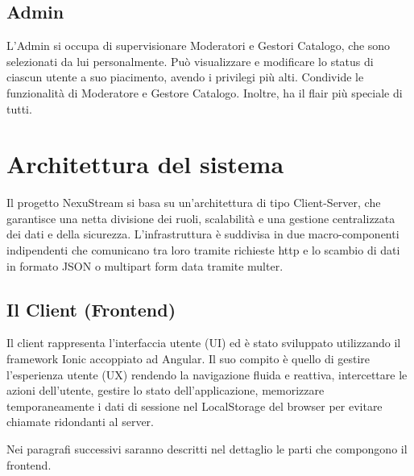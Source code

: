\documentclass[11pt,a4paper]{article}
\begin{document}
\subsection{Admin}
L'Admin si occupa di supervisionare Moderatori e Gestori Catalogo, che sono selezionati da lui personalmente. Può visualizzare e modificare lo status di ciascun utente a suo piacimento, avendo i privilegi più alti. Condivide le funzionalità di Moderatore e Gestore Catalogo. Inoltre, ha il flair più speciale di tutti.

\section{Architettura del sistema}
Il progetto NexuStream si basa su un’architettura di tipo Client-Server, che garantisce una netta divisione dei ruoli, scalabilità e una gestione centralizzata dei dati e della sicurezza. L’infrastruttura è suddivisa in due macro-componenti indipendenti che comunicano tra loro tramite richieste http e lo scambio di dati in formato JSON o multipart form data tramite multer.

\subsection{Il Client (Frontend)}
Il client rappresenta l’interfaccia utente (UI) ed è stato sviluppato utilizzando il framework Ionic accoppiato ad Angular. Il suo compito è quello di gestire l’esperienza utente (UX) rendendo la navigazione fluida e reattiva, intercettare le azioni dell’utente, gestire lo stato dell’applicazione, memorizzare temporaneamente i dati di sessione nel LocalStorage del browser per evitare chiamate ridondanti al server.

Nei paragrafi successivi saranno descritti nel dettaglio le parti che compongono il frontend.
\end{document}

